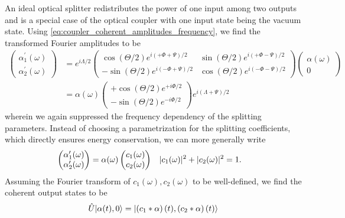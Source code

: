 An ideal optical splitter redistributes the power of one input among two outputs and is a special case of the optical coupler with one input state being the vacuum state.
Using \cref{eq:coupler_coherent_amplitudes_frequency}, we find the transformed Fourier amplitudes to be
\begin{equation}
	\begin{split}
		\begin{pmatrix}
			\alpha_1^\prime(\omega) \\
			\alpha_2^\prime(\omega)
		\end{pmatrix}
		&=
		e^{i\Lambda/2}
		\begin{pmatrix}
			\cos(\Theta/2)
			e^{i\left(+\Phi+\Psi\right)/2}
			&
			\sin(\Theta/2)
			e^{i\left(+\Phi-\Psi\right)/2}
			\\
			-
			\sin(\Theta/2)
			e^{i\left(-\Phi+\Psi\right)/2}
			&
			\cos(\Theta/2)
			e^{i\left(-\Phi-\Psi\right)/2}
		\end{pmatrix}
		\begin{pmatrix}
			\alpha(\omega) \\
			0
		\end{pmatrix}
		\\
		&=
		\alpha(\omega)
		\begin{pmatrix}
			+
			\cos(\Theta/2)
			e^{+i\Phi/2}
			\\
			-
			\sin(\Theta/2)
			e^{-i\Phi/2}
		\end{pmatrix}
		e^{i(\Lambda+\Psi)/2}
	\end{split}
\end{equation}
wherein we again suppressed the frequency dependency of the splitting parameters.
Instead of choosing a parametrization for the splitting coefficients, which directly ensures energy conservation, we can more generally write
\begin{align}
	\begin{pmatrix}
		\alpha_1^\prime(\omega) \\
		\alpha_2^\prime(\omega)
	\end{pmatrix}
	&=
	\alpha(\omega)
	\begin{pmatrix}
		c_1(\omega) \\
		c_2(\omega)
	\end{pmatrix}
	&
	\lvert c_1(\omega)\rvert^2
	+
	\lvert c_2(\omega)\rvert^2
	&=
	1
	.
\end{align}
Assuming the Fourier transform of $c_1(\omega),c_2(\omega)$ to be well-defined, we find the coherent output states to be
\begin{equation}
	\hat{U}
	\ket*{\alpha(t),0}
	=
	\ket*{\left(c_1*\alpha\right)(t),\left(c_2*\alpha\right)(t)}
	\label{eq:splitter_state_convolution}
\end{equation}
